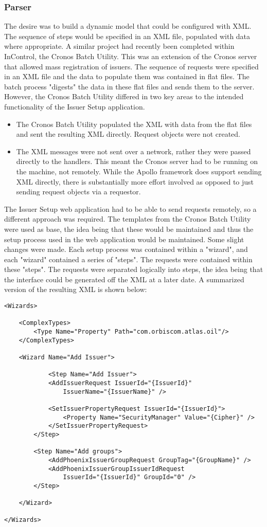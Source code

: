 \documentclass[a4paper, 11pt, titlepage]{article}
\begin{document}
\subsubsection{Parser} 
The desire was to build a dynamic model that could be configured with XML. The sequence of steps would be specified in an XML file, populated with data where appropriate. A similar project had recently been completed within InControl, the Cronos Batch Utility. This was an extension of the Cronos server that allowed mass registration of issuers. The sequence of requests were specified in an XML file and the data to populate them was contained in flat files. The batch process "digests" the data in these flat files and sends them to the server. However, the Cronos Batch Utility differed in two key areas to the intended functionality of the Issuer Setup application. 
\begin{itemize} 
\item The Cronos Batch Utility populated the XML with data from the flat files and sent the resulting XML directly. Request objects were not created. 
\item The XML messages were not sent over a network, rather they were passed directly to the handlers. This meant the Cronos server had to be running on the machine, not remotely. While the Apollo framework does support sending XML directly, there is substantially more effort involved as opposed to just sending request objects via a requestor.  
\end{itemize} 
The Issuer Setup web application had to be able to send requests remotely, so a different approach was required. The templates from the Cronos Batch Utility were used as base, the idea being that these would be maintained and thus the setup process used in the web application would be maintained. Some slight changes were made. Each setup process was contained within a "wizard", and each "wizard" contained a series of "steps". The requests were contained within these "steps". The requests were separated logically into steps, the idea being that the interface could be generated off the XML at a later date. A summarized version of the resulting XML is shown below: 
\begin{verbatim} 
<Wizards> 
 
    <ComplexTypes> 
        <Type Name="Property" Path="com.orbiscom.atlas.oil"/> 
    </ComplexTypes> 
 
    <Wizard Name="Add Issuer"> 
 
            <Step Name="Add Issuer"> 
            <AddIssuerRequest IssuerId="{IssuerId}"
                IssuerName="{IssuerName}" /> 
 
            <SetIssuerPropertyRequest IssuerId="{IssuerId}"> 
                <Property Name="SecurityManager" Value="{Cipher}" /> 
            </SetIssuerPropertyRequest> 
        </Step> 
		 
        <Step Name="Add groups"> 
            <AddPhoenixIssuerGroupRequest GroupTag="{GroupName}" /> 
            <AddPhoenixIssuerGroupIssuerIdRequest 
                IssuerId="{IssuerId}" GroupId="0" />	 
        </Step> 
	 
    </Wizard> 
 
</Wizards> 
\end{verbatim} 
 
\end{document}

